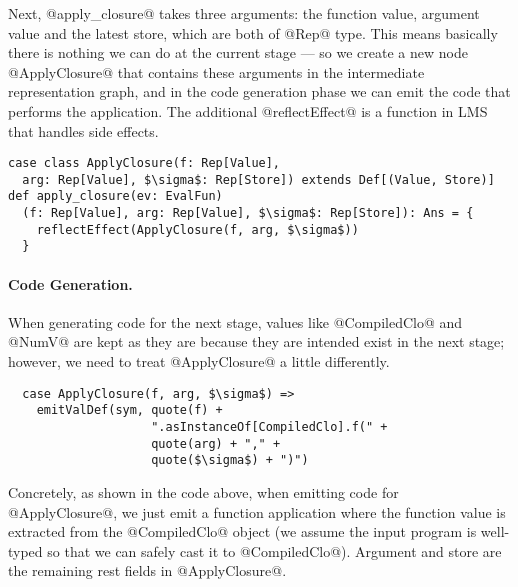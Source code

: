 Next, @apply_closure@ takes three arguments: the function value, argument value and the latest store, 
which are both of @Rep@ type. This means basically there is nothing we can do at the current stage --- 
so we create a new node @ApplyClosure@ that contains these arguments in the intermediate representation graph,
and in the code generation phase we can emit the code that performs the application. The additional @reflectEffect@
is a function in LMS that handles side effects.

\begin{lstlisting}
case class ApplyClosure(f: Rep[Value], 
  arg: Rep[Value], $\sigma$: Rep[Store]) extends Def[(Value, Store)]
def apply_closure(ev: EvalFun)
  (f: Rep[Value], arg: Rep[Value], $\sigma$: Rep[Store]): Ans = {
    reflectEffect(ApplyClosure(f, arg, $\sigma$))
  }
\end{lstlisting}

\paragraph{Code Generation.}
When generating code for the next stage, values like @CompiledClo@ and @NumV@ are kept as they are because
they are intended exist in the next stage; however, we need to treat @ApplyClosure@ a little differently.

\begin{lstlisting}
  case ApplyClosure(f, arg, $\sigma$) => 
    emitValDef(sym, quote(f) + 
                    ".asInstanceOf[CompiledClo].f(" + 
                    quote(arg) + "," + 
                    quote($\sigma$) + ")")
\end{lstlisting}

Concretely, as shown in the code above, when emitting code for @ApplyClosure@, we just 
emit a function application where the function value is extracted from the @CompiledClo@ object
(we assume the input program is well-typed so that we can safely cast it to @CompiledClo@).
Argument and store are the remaining rest fields in @ApplyClosure@.

